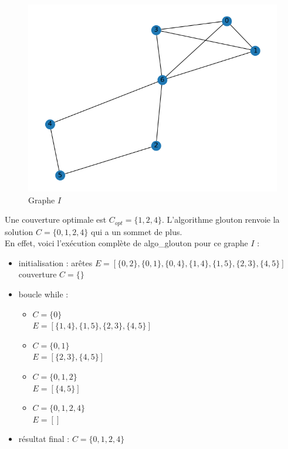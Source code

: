 \documentclass[12pt]{article}
\begin{document}
        \begin{figure}[h]
            \caption{Graphe $I$}
            \includegraphics[scale=0.7]{figures/q3-1.png}
            \centering
        \end{figure}

        Une couverture optimale est $C_{opt} = \{1,2,4\}$. L'algorithme glouton renvoie la solution $C = \{0,1,2,4\}$ qui a un sommet de plus. \\
        En effet, voici l'exécution complète de algo\_glouton pour ce graphe $I$ :

        \begin{itemize}
            \item initialisation : arêtes $E = [\{0,2\},\{0,1\},\{0,4\},\{1,4\},\{1,5\},\{2,3\},\{4,5\}]$ \\
            couverture $C = \{\}$
            \item boucle while :
                \begin{itemize}
                    \item $C = \{0\}$ \\
                    $E = [\{1,4\},\{1,5\},\{2,3\},\{4,5\}]$
                    \item $C = \{0,1\}$ \\
                    $E = [\{2,3\},\{4,5\}]$
                    \item $C = \{0,1,2\}$ \\
                    $E = [\{4,5\}]$
                    \item $C = \{0,1,2,4\}$ \\
                    $E = []$
                \end{itemize}
            \item résultat final : $C = \{0,1,2,4\}$
        \end{itemize}
\end{document}
